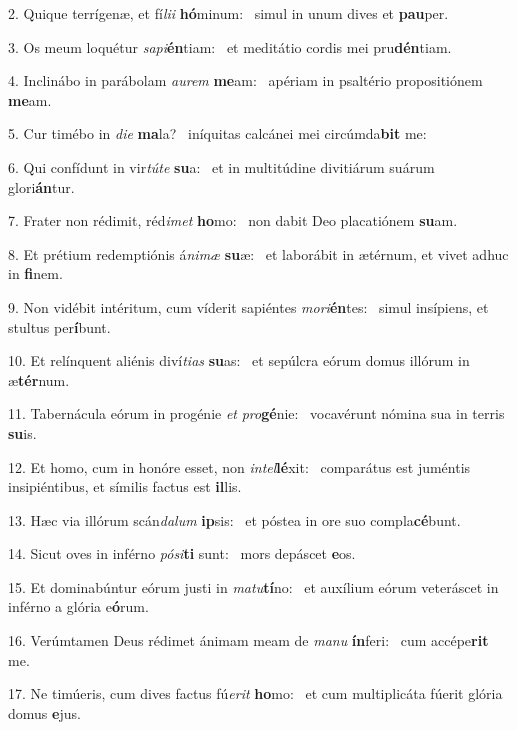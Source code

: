 2. Quique terrígenæ, et fí\textit{li}\textit{i} \textbf{hó}minum: \ast\  simul in unum dives et \textbf{pau}per.\

3. Os meum loquétur \textit{sa}\textit{pi}\textbf{én}tiam: \ast\  et meditátio cordis mei pru\textbf{dén}tiam.\

4. Inclinábo in parábolam \textit{au}\textit{rem} \textbf{me}am: \ast\  apériam in psaltério propositiónem \textbf{me}am.\

5. Cur timébo in \textit{di}\textit{e} \textbf{ma}la? \ast\  iníquitas calcánei mei circúmda\textbf{bit} me:\

6. Qui confídunt in vir\textit{tú}\textit{te} \textbf{su}a: \ast\  et in multitúdine divitiárum suárum glori\textbf{án}tur.\

7. Frater non rédimit, réd\textit{i}\textit{met} \textbf{ho}mo: \ast\  non dabit Deo placatiónem \textbf{su}am.\

8. Et prétium redemptiónis á\textit{ni}\textit{mæ} \textbf{su}æ: \ast\  et laborábit in ætérnum, et vivet adhuc in \textbf{fi}nem.\

9. Non vidébit intéritum, cum víderit sapiéntes \textit{mo}\textit{ri}\textbf{én}tes: \ast\  simul insípiens, et stultus per\textbf{í}bunt.\

10. Et relínquent aliénis diví\textit{ti}\textit{as} \textbf{su}as: \ast\  et sepúlcra eórum domus illórum in æ\textbf{tér}num.\

11. Tabernácula eórum in progénie \textit{et} \textit{pro}\textbf{gé}nie: \ast\  vocavérunt nómina sua in terris \textbf{su}is.\

12. Et homo, cum in honóre esset, non \textit{in}\textit{tel}\textbf{lé}xit: \ast\  comparátus est juméntis insipiéntibus, et símilis factus est \textbf{il}lis.\

13. Hæc via illórum scán\textit{da}\textit{lum} \textbf{ip}sis: \ast\  et póstea in ore suo compla\textbf{cé}bunt.\

14. Sicut oves in inférno \textit{pó}\textit{si}\textbf{ti} sunt: \ast\  mors depáscet \textbf{e}os.\

15. Et dominabúntur eórum justi in \textit{ma}\textit{tu}\textbf{tí}no: \ast\  et auxílium eórum veteráscet in inférno a glória e\textbf{ó}rum.\

16. Verúmtamen Deus rédimet ánimam meam de \textit{ma}\textit{nu} \textbf{ín}feri: \ast\  cum accépe\textbf{rit} me.\

17. Ne timúeris, cum dives factus fú\textit{e}\textit{rit} \textbf{ho}mo: \ast\  et cum multiplicáta fúerit glória domus \textbf{e}jus.\

